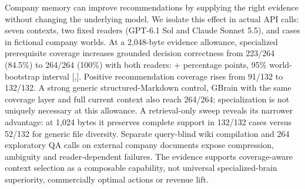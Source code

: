 Company memory can improve recommendations by supplying the right evidence without changing the underlying model. We isolate this effect in \MainCalls{} actual API calls: seven contexts, two fixed readers (GPT-6.1 Sol and Claude Sonnet 5.5), and \MainCases{} cases in \MainWorlds{} fictional company worlds. At a 2,048-byte evidence allowance, specialized prerequisite coverage increases grounded decision correctness from 223/264 (84.5\%) to 264/264 (100\%) with both readers: +\GptDifference{} percentage points, 95\% world-bootstrap interval [\GptLow{},\GptHigh{}]. Positive recommendation coverage rises from 91/132 to 132/132. A strong generic structured-Markdown control, GBrain with the same coverage layer and full current context also reach 264/264; specialization is not uniquely necessary at this allowance. A retrieval-only sweep reveals its narrower advantage: at 1,024 bytes it preserves complete support in 132/132 cases versus 52/132 for generic file diversity. Separate query-blind wiki compilation and 264 exploratory QA calls on external company documents expose compression, ambiguity and reader-dependent failures. The evidence supports coverage-aware context selection as a composable capability, not universal specialized-brain superiority, commercially optimal actions or revenue lift.
